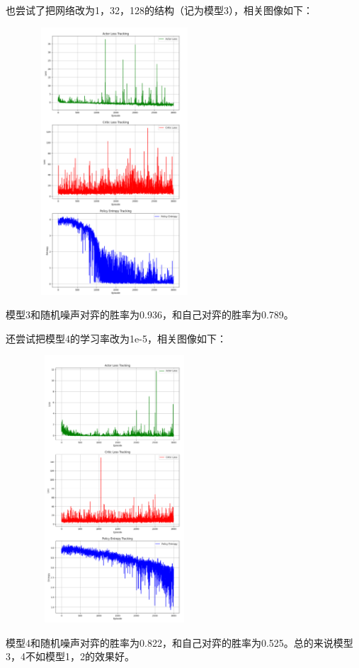 \documentclass{ctexart}
\begin{document}
也尝试了把网络改为1，32，128的结构（记为模型3），相关图像如下：
	\begin{figure}[H]
		\centering 
		\includegraphics[height=10cm,width=6cm]{8.png}
		\end{figure}
模型3和随机噪声对弈的胜率为0.936，和自己对弈的胜率为0.789。
	
还尝试把模型4的学习率改为1e-5，相关图像如下：
	\begin{figure}[H]
		\centering 
		\includegraphics[height=10cm,width=6cm]{9.png}
		\end{figure}
		模型4和随机噪声对弈的胜率为0.822，和自己对弈的胜率为0.525。总的来说模型3，4不如模型1，2的效果好。
\end{document}
